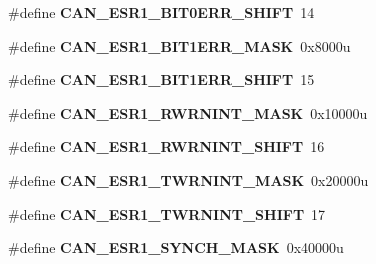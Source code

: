 \begin{DoxyCompactItemize}
\item 
\#define {\bfseries C\+A\+N\+\_\+\+E\+S\+R1\+\_\+\+B\+I\+T0\+E\+R\+R\+\_\+\+S\+H\+I\+FT}~14\hypertarget{group__CAN__Register__Masks_ga949e83e6333f8b4ddd5b2fb77585e2e9}{}\label{group__CAN__Register__Masks_ga949e83e6333f8b4ddd5b2fb77585e2e9}

\item 
\#define {\bfseries C\+A\+N\+\_\+\+E\+S\+R1\+\_\+\+B\+I\+T1\+E\+R\+R\+\_\+\+M\+A\+SK}~0x8000u\hypertarget{group__CAN__Register__Masks_ga8a260202c5a157354042a1fba8cbc882}{}\label{group__CAN__Register__Masks_ga8a260202c5a157354042a1fba8cbc882}

\item 
\#define {\bfseries C\+A\+N\+\_\+\+E\+S\+R1\+\_\+\+B\+I\+T1\+E\+R\+R\+\_\+\+S\+H\+I\+FT}~15\hypertarget{group__CAN__Register__Masks_ga2118504746ecc7ba810d5ed44dd7c31f}{}\label{group__CAN__Register__Masks_ga2118504746ecc7ba810d5ed44dd7c31f}

\item 
\#define {\bfseries C\+A\+N\+\_\+\+E\+S\+R1\+\_\+\+R\+W\+R\+N\+I\+N\+T\+\_\+\+M\+A\+SK}~0x10000u\hypertarget{group__CAN__Register__Masks_gaf0e71745a764581c68a93feef2db8602}{}\label{group__CAN__Register__Masks_gaf0e71745a764581c68a93feef2db8602}

\item 
\#define {\bfseries C\+A\+N\+\_\+\+E\+S\+R1\+\_\+\+R\+W\+R\+N\+I\+N\+T\+\_\+\+S\+H\+I\+FT}~16\hypertarget{group__CAN__Register__Masks_gafcbf44277d9766061369a79e2ff761a2}{}\label{group__CAN__Register__Masks_gafcbf44277d9766061369a79e2ff761a2}

\item 
\#define {\bfseries C\+A\+N\+\_\+\+E\+S\+R1\+\_\+\+T\+W\+R\+N\+I\+N\+T\+\_\+\+M\+A\+SK}~0x20000u\hypertarget{group__CAN__Register__Masks_gaf6b96813ed300d4649d7daec40351861}{}\label{group__CAN__Register__Masks_gaf6b96813ed300d4649d7daec40351861}

\item 
\#define {\bfseries C\+A\+N\+\_\+\+E\+S\+R1\+\_\+\+T\+W\+R\+N\+I\+N\+T\+\_\+\+S\+H\+I\+FT}~17\hypertarget{group__CAN__Register__Masks_ga651c6aee47d004060a9dbc10369cf784}{}\label{group__CAN__Register__Masks_ga651c6aee47d004060a9dbc10369cf784}

\item 
\#define {\bfseries C\+A\+N\+\_\+\+E\+S\+R1\+\_\+\+S\+Y\+N\+C\+H\+\_\+\+M\+A\+SK}~0x40000u\hypertarget{group__CAN__Register__Masks_ga908135f00230ede2890a9db408908d34}{}\label{group__CAN__Register__Masks_ga908135f00230ede2890a9db408908d34}


\end{DoxyCompactItemize}
